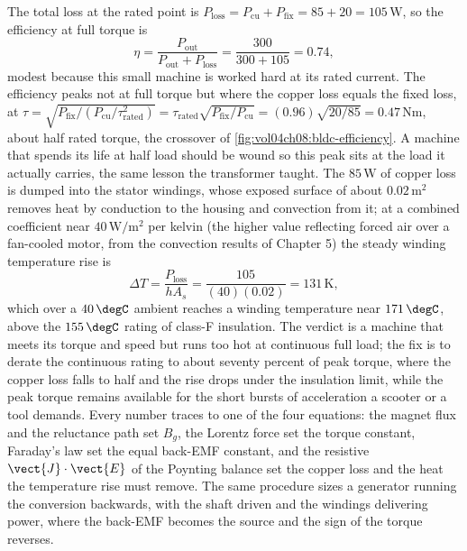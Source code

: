 The total loss at the rated point is $P_{\text{loss}} = P_{\text{cu}} +
P_{\text{fix}} = 85 + 20 = 105\,\si{\watt}$, so the efficiency at full
torque is
\[
\eta = \frac{P_{\text{out}}}{P_{\text{out}} + P_{\text{loss}}} =
\frac{300}{300 + 105} = 0.74,
\]
modest because this small machine is worked hard at its rated current. The
efficiency peaks not at full torque but where the copper loss equals the
fixed loss, at $\tau = \sqrt{P_{\text{fix}}/(P_{\text{cu}}/\tau_{\text{
rated}}^{2})} = \tau_{\text{rated}}\sqrt{P_{\text{fix}}/P_{\text{cu}}} =
(0.96)\sqrt{20/85} = 0.47\,\si{\newton\meter}$, about half rated torque,
the crossover of \cref{fig:vol04ch08:bldc-efficiency}. A machine that
spends its life at half load should be wound so this peak sits at the load
it actually carries, the same lesson the transformer taught. The
$85\,\si{\watt}$ of copper loss is dumped into the stator windings, whose
exposed surface of about $0.02\,\si{\meter\squared}$ removes heat by
conduction to the housing and convection from it; at a combined
coefficient near $40\,\si{\watt\per\meter\squared}$ per kelvin (the higher
value reflecting forced air over a fan-cooled motor, from the convection
results of Chapter 5) the steady winding temperature rise is
\[
\Delta T = \frac{P_{\text{loss}}}{h A_s} = \frac{105}{(40)(0.02)} =
131\,\si{\kelvin},
\]
which over a $40\,\degC$ ambient reaches a winding temperature near
$171\,\degC$, above the $155\,\degC$ rating of class-F insulation. The
verdict is a machine that meets its torque and speed but runs too hot at
continuous full load; the fix is to derate the continuous rating to about
seventy percent of peak torque, where the copper loss falls to half and
the rise drops under the insulation limit, while the peak torque remains
available for the short bursts of acceleration a scooter or a tool
demands. Every number traces to one of the four equations: the magnet
flux and the reluctance path set $B_g$, the Lorentz force set the torque
constant, Faraday's law set the equal back-EMF constant, and the resistive
$\vect{J}\cdot\vect{E}$ of the Poynting balance set the copper loss and the
heat the temperature rise must remove. The same procedure sizes a
generator running the conversion backwards, with the shaft driven and the
windings delivering power, where the back-EMF becomes the source and the
sign of the torque reverses.


